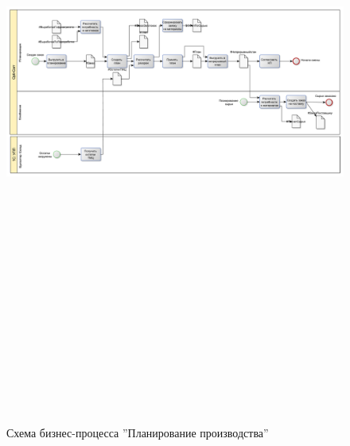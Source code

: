 \begin{figure}[!htb]
\centering
  \includegraphics[width=200mm, height=220mm, angle=90, keepaspectratio]{50_Pics/3_Plan.pdf}
\caption{Схема бизнес-процесса ''Планирование производства''}
\label{pic:3_Planning}
\end{figure} 

\clearpage


